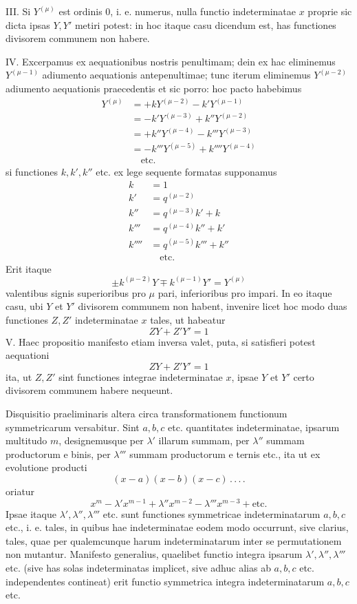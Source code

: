 \par
{}
III. Si $Y^{(\mu)}$ est ordinis 0, i. e. numerus, nulla functio indeterminatae $x$
proprie sic dicta ipsas $Y,Y'$ metiri potest: in hoc itaque casu dicendum est, has
functiones divisorem communem non habere.

IV. Excerpamus ex aequationibus nostris penultimam; dein ex hac eliminemus $Y^{(\mu-1)}$ adiumento aequationis antepenultimae; tunc iterum eliminemus
$Y^{(\mu-2)}$ adiumento aequationis praecedentis et sic porro: hoc pacto habebimus
\[
\begin{aligned}
Y^{(\mu)}&=+kY^{(\mu-2)}-k'Y^{(\mu-1)}\\
&=-k'Y^{(\mu-3)}+k''Y^{(\mu-2)}\\
&=+k''Y^{(\mu-4)}-k'''Y^{(\mu-3)}\\
&=-k'''Y^{(\mu-5)}+k''''Y^{(\mu-4)}\\
&\quad\text{etc.}
\end{aligned}
\]
si functiones $k,k',k''$ etc. ex lege sequente formatas supponamus
\[
\begin{aligned}
k&=1\\
k'&=q^{(\mu-2)}\\
k''&=q^{(\mu-3)}k'+k\\
k'''&=q^{(\mu-4)}k''+k'\\
k''''&=q^{(\mu-5)}k'''+k''\\
&\quad\text{etc.}
\end{aligned}
\]
Erit itaque
\[
\pm k^{(\mu-2)}Y\mp k^{(\mu-1)}Y'=Y^{(\mu)}
\]
valentibus signis superioribus pro $\mu$ pari, inferioribus pro impari. In eo itaque
casu, ubi $Y$ et $Y'$ divisorem communem non habent, invenire licet hoc modo
duas functiones $Z,Z'$ indeterminatae $x$ tales, ut habeatur
\[
ZY+Z'Y'=1
\]
V. Haec propositio manifesto etiam inversa valet, puta, si satisfieri potest
aequationi
\[
ZY+Z'Y'=1
\]
ita, ut $Z,Z'$ sint functiones integrae indeterminatae $x$, ipsae $Y$ et $Y'$ certo divisorem communem habere nequeunt.

Disquisitio praeliminaris altera circa transformationem functionum symmetricarum versabitur. Sint $a,b,c$ etc. quantitates indeterminatae, ipsarum multitudo $m$, designemusque per $\lambda'$ illarum summam, per $\lambda''$ summam productorum e
binis, per $\lambda'''$ summam productorum e ternis etc., ita ut ex evolutione producti
\[
(x-a)(x-b)(x-c)\, .\, .\, .\, .
\]
oriatur
\[
x^m-\lambda'x^{m-1}+\lambda''x^{m-2}-\lambda'''x^{m-3}+\text{etc.}
\]
Ipsae itaque $\lambda',\lambda'',\lambda'''$ etc. sunt functiones symmetricae indeterminatarum $a,b,c$ etc.,
i. e. tales, in quibus hae indeterminatae eodem modo occurrunt, sive clarius, tales, quae per qualemcunque harum indeterminatarum inter se permutationem non
mutantur. Manifesto generalius, quaelibet functio integra ipsarum $\lambda',\lambda'',\lambda'''$ etc.
(sive has solas indeterminatas implicet, sive adhuc alias ab $a,b,c$ etc. independentes contineat) erit functio symmetrica integra indeterminatarum $a,b,c$ etc.


